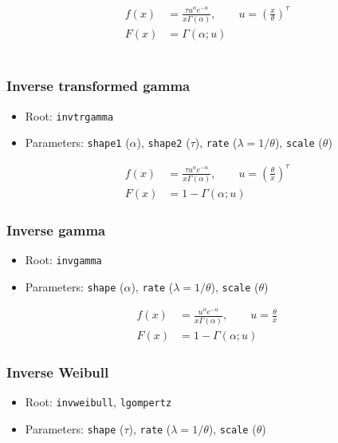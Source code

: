 \documentclass[x11names]{article}
\newcommand{\code}[1]{\texttt{#1}}
\begin{document}
\begin{align*}
  f(x) &= \frac{\tau u^\alpha e^{-u}}{x \Gamma(\alpha)},
  \qquad u = \left( \frac{x}{\theta} \right)^\tau \\
  F(x) &= \Gamma (\alpha ; u)
\end{align*} \\

\subsubsection*{Inverse transformed gamma}

\begin{itemize}
\item Root: \code{invtrgamma}
\item Parameters: \code{shape1} ($\alpha$),
      \code{shape2} ($\tau$),
      \code{rate}   ($\lambda = 1/\theta$),
      \code{scale}  ($\theta$)
\end{itemize}

\begin{align*}
  f(x) &= \frac{\tau u^\alpha e^{-u}}{x\Gamma (\alpha)},
  \qquad u = \left( \frac{\theta}{x} \right)^\tau \\
  F(x) &= 1 - \Gamma (\alpha ; u)
\end{align*}

\subsubsection*{Inverse gamma}

\begin{itemize}
\item Root: \code{invgamma}
\item Parameters: \code{shape} ($\alpha$),
      \code{rate}   ($\lambda = 1/\theta$),
      \code{scale}  ($\theta$)
\end{itemize}

\begin{align*}
  f(x) &= \frac{u^\alpha e^{-u}}{x\Gamma (\alpha)},
  \qquad u = \frac{\theta}{x}\\
  F(x) &= 1 - \Gamma (\alpha ; u)
\end{align*}


\subsubsection*{Inverse Weibull}

\begin{itemize}
\item Root: \code{invweibull}, \code{lgompertz}
\item Parameters: \code{shape} ($\tau$),
      \code{rate}   ($\lambda = 1/\theta$),
      \code{scale}  ($\theta$)
\end{itemize}
\end{document}
